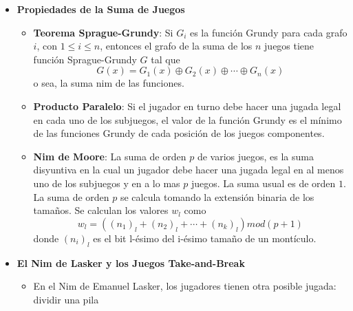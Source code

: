 \begin{itemize}
{\begin{itemize}
{			}
			\item{
				\textbf{Si el jugador en turno elige un conjunto no vac\'io de juegos (posiblemente todos) y hace una jugada 
				en todos ellos}: Una posici\'on es perdedora si y solo si cada juego est\'a en una posici\'on perdedora.
			}
			\item{
				\textbf{Si el jugador en turno elige un subconjunto propio (no vac\'io, pero no todos) de juegos y hace una jugada 
				en todos ellos}: La posici\'on es perdedora ssi todos los valores Grundy de los juegos son iguales.
			}
			\item{
				\textbf{Si el jugador debe jugar en todos los juegos y pierde si no puede mover en alguno}: Una posici\'on es perdedora 
				ssi alguno de los juegos esta en una posici\'on perdedora.
			}
		\end{itemize}
    }
    \item{
		\textbf{Propiedades de la Suma de Juegos}
		\begin{itemize}
			\item{
				 \textbf{Teorema Sprague-Grundy}: Si $G_i$ es la funci\'on Grundy para cada 
				 grafo $i$, con $1 \leq i \leq n $, entonces el grafo de la suma de los $n$ juegos 
				 tiene funci\'on Sprague-Grundy $G$ tal que 
				 $$ G(x) = G_1(x) \oplus G_2(x) \oplus \cdots \oplus G_n(x) $$ 
				 o sea, la suma nim de las funciones.
			}
			\item{
				\textbf{Producto Paralelo}: Si el jugador en turno debe hacer una jugada legal en 
				cada uno de los subjuegos, el valor de la funci\'on Grundy es el m\'inimo de las 
				funciones Grundy de cada posici\'on de los juegos componentes. 
			}
			\item{
				\textbf{Nim de Moore}: La suma de orden $p$ de varios juegos, es la suma disyuntiva 
				en la cual un jugador debe hacer una jugada legal en al menos uno de los subjuegos 
				y en a lo mas $p$ juegos. La suma usual es de orden $1$. La suma de orden $p$ se calcula 
				tomando la extensi\'on binaria de los tama\~nos. Se calculan los valores $w_l$  como
				$$ w_l = ((n_1)_l + (n_2)_l + \cdots + (n_k)_l) mod (p+1) $$
				donde $(n_i)_l$ es el bit l-\'esimo del i-\'esimo tama\~no de un mont\'iculo. 
			}
		\end{itemize}
    }
    \item{
		\textbf{El Nim de Lasker y los Juegos Take-and-Break}
		\begin{itemize}
			\item{
				En el Nim de Emanuel Lasker, los jugadores tienen otra posible jugada: dividir una pila 
}
\end{itemize}}
\end{itemize}
